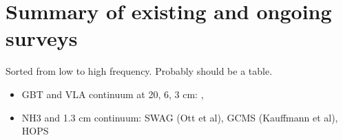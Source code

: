 \section{Summary of existing and ongoing surveys}
Sorted from low to high frequency.  Probably should be a table.

\begin{itemize}
    \item GBT and VLA continuum at 20, 6, 3 cm: \citet{Law2008a}, \citet{Law2008b}
    \item NH3 and 1.3 cm continuum: SWAG (Ott et al), GCMS (Kauffmann et al), HOPS \citep{Walsh2011a}
    
\end{itemize}